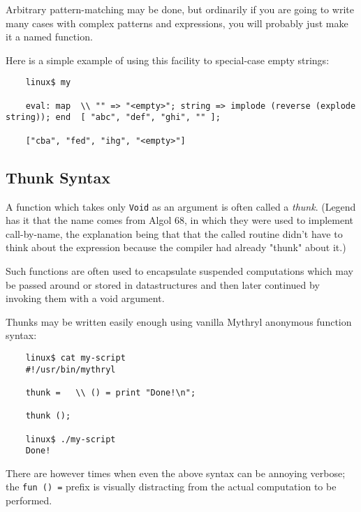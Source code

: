 Arbitrary pattern-matching may be done, but ordinarily if you 
are going to write many cases with complex patterns and  
expressions, you will probably just make it a named function.

Here is a simple example of using this facility to special-case empty strings:

\begin{verbatim}
    linux$ my

    eval: map  \\ "" => "<empty>"; string => implode (reverse (explode string)); end  [ "abc", "def", "ghi", "" ];

    ["cba", "fed", "ihg", "<empty>"]
\end{verbatim}


\cutend*


\subsection{Thunk Syntax}
\label{section:ref:functions:thunk-syntax}

A function which takes only {\tt Void} as an argument  
is often called a {\it thunk}.  (Legend has it that 
the name comes from Algol 68, in which they were 
used to implement call-by-name, the explanation 
being that that the called routine didn't have to 
think about the expression because the compiler had 
already "thunk" about it.)

Such functions are 
often used to encapsulate suspended computations which 
may be passed around or stored in datastructures and 
then later continued by invoking them with a void 
argument.

Thunks may be written easily enough using vanilla 
Mythryl anonymous function syntax:

\begin{verbatim}
    linux$ cat my-script
    #!/usr/bin/mythryl

    thunk =   \\ () = print "Done!\n";

    thunk ();

    linux$ ./my-script
    Done!
\end{verbatim}

There are however times when even the above syntax can be 
annoying verbose;  the {\tt fun () =} prefix is visually 
distracting from the actual computation to be performed.

